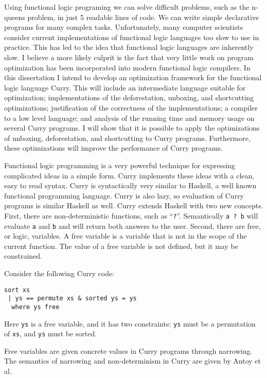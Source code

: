
Using functional logic programing we can solve difficult problems, such as the n-queens problem, in
just 5 readable lines of code.
We can write simple declarative programs for many complex tasks.
Unfortunately, many computer scientists consider current implementations of functional logic languages
too slow to use in practice.
This has led to the idea that functional logic languages are inherently slow.
I believe a more likely culprit is the fact that very little work on program optimization 
has been incorporated into modern functional logic compilers.
In this dissertation I intend to develop an optimization framework for the functional logic language Curry.
This will include an intermediate language suitable for optimization;
implementations of the deforestation, unboxing, and shortcutting optimizations;
justification of the correctness of the implementations;
a compiler to a low level language;
and analysis of the running time and memory usage on several Curry programs.
I will show that it is possible to apply the optimizations of unboxing, deforestation, and shortcutting to Curry programs.
Furthermore, these optimizations will improve the performance of Curry programs.

Functional logic programming is a very powerful technique for expressing complicated ideas in a simple form.
Curry implements these ideas with a clean, easy to read syntax.
Curry is syntactically very similar to Haskell, a well known functional programming language.
Curry is also lazy, so evaluation of Curry programs is similar Haskell as well.
Curry extends Haskell with two new concepts.
First, there are non-deterministic functions, such as ``\texttt{?}''.  
Semantically \texttt{a ? b} will evaluate \texttt{a} and \texttt{b} and will return both answers to the user.
Second, there are free, or logic, variables.
A free variable is a variable that is not in the scope of the current function.
The value of a free variable is not defined, but it may be constrained.

Consider the following Curry code:
\begin{verbatim}
sort xs
 | ys == permute xs & sorted ys = ys
  where ys free
\end{verbatim}
Here \texttt{ys} is a free variable, and it has two constraints:
\texttt{ys} must be a permutation of \texttt{xs}, and \texttt{ys} must be sorted.

Free variables are given concrete values in Curry programs through narrowing.
The semantics of narrowing and non-determinism in Curry are given by Antoy et al. \cite{Antoy97ALP}

